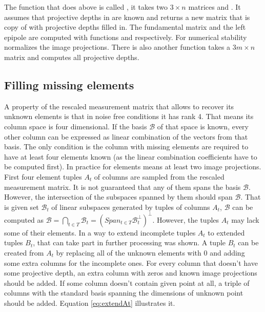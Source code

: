 \documentclass[12pt]{article}
\begin{document}
The function that does above is called , it
takes two $3 \times n$ matrices  and . It assumes that
projective depths in  are known and returns a new matrix that is copy of
 with projective depths filled in. The fundamental matrix and the left
epipole are computed with functions  and
 respectively. For numerical stability
 normalizes the image projections. There is also
another function  takes a $3m \times n$
matrix and computes all projective depths.

\subsection{Filling missing elements}

A property of the rescaled measurement matrix that allows to recover its unknown
elements is that in noise free conditions it has rank 4. That means its column
space is four dimensional. If the basis $\mathcal{B}$ of that space is known,
every other column can be expressed as linear combination of the vectors from
that basis. The only condition is the column with missing elements are required
to have at least four elements known (as the linear combination coefficients
have to be computed first). In practice for elements means at least two image
projections. First four element tuples $A_t$ of columns are sampled from the
rescaled measurement matrix. It is not guaranteed that any of them spans the
basis $\mathcal{B}$. However, the intersection of the subspaces spanned by them
should span $\mathcal{B}$. That is given set $\mathcal{B}_t$ of linear subspaces
generated by tuples of columns $A_t$, $\mathcal{B}$ can be computed as
$\mathcal{B} = \bigcap_{t \in T} \mathcal{B}_t = (Span_{t \in T}
\mathcal{B}_t^\bot)^\bot$.  However, the tuples $A_t$ may lack some of their
elements. In \cite{svoboda04} a way to extend incomplete tuples $A_t$ to
extended tuples $B_t$, that can take part in further processing was shown. A
tuple $B_t$ can be created from $A_t$ by replacing all of the unknown elements
with $0$ and adding some extra columns for the incomplete ones. For  every
column that doesn't have some projective depth, an extra column with zeros and
known  image projections should be added. If some column doesn't contain given
point at all, a triple   of columns with the standard basis spanning the
dimensions of unknown point should be added.   Equation \ref{eq:extendAt}
illustrates it.
\end{document}
